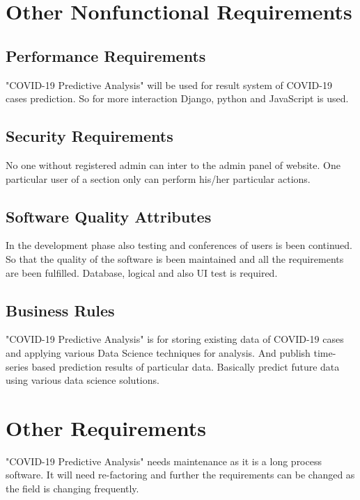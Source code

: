 \documentclass{scrreprt}
\begin{document}
\chapter{Other Nonfunctional Requirements}

\section{Performance Requirements}
"COVID-19 Predictive Analysis" will be used for result system of COVID-19 cases prediction. So for more interaction Django, python and JavaScript is used. 

\section{Security Requirements}
No one without registered admin can inter to the admin panel of website. One particular user of a section only can perform his/her particular actions. 

\section{Software Quality Attributes}
In the development phase also testing and conferences of users is been continued. So that the quality of the software is been maintained and all the requirements are been fulfilled.
\newline
Database, logical and also UI test is required. 

\section{Business Rules}
"COVID-19 Predictive Analysis" is for storing existing data of COVID-19 cases and applying various Data Science techniques for analysis. And publish time-series based prediction results of particular data.
\newline
Basically predict future data using various data science solutions. 


\chapter{Other Requirements}
"COVID-19 Predictive Analysis" needs maintenance as it is a long process software. It will need re-factoring and further the requirements can be changed as the field is changing frequently. 
\end{document}
